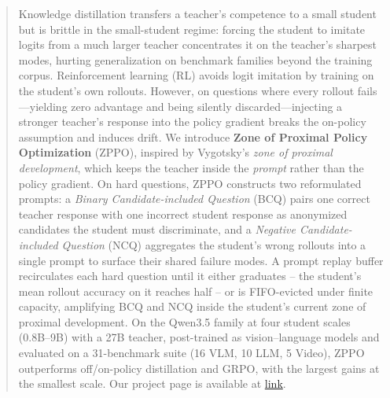\begin{abstract}
    Knowledge distillation transfers a teacher's competence to a small student but is brittle in the small-student regime: forcing the student to imitate logits from a much larger teacher concentrates it on the teacher's sharpest modes, hurting generalization on benchmark families beyond the training corpus. Reinforcement learning (RL) avoids logit imitation by training on the student's own rollouts. However, on questions where every rollout fails—yielding zero advantage and being silently discarded—injecting a stronger teacher's response into the policy gradient breaks the on-policy assumption and induces drift. We introduce \textbf{Zone of Proximal Policy Optimization} (ZPPO), inspired by Vygotsky's \emph{zone of proximal development}, which keeps the teacher inside the \emph{prompt} rather than the policy gradient. On hard questions, ZPPO constructs two reformulated prompts: a \emph{Binary Candidate-included Question} (BCQ) pairs one correct teacher response with one incorrect student response as anonymized candidates the student must discriminate, and a \emph{Negative Candidate-included Question} (NCQ) aggregates the student's wrong rollouts into a single prompt to surface their shared failure modes. A prompt replay buffer recirculates each hard question until it either graduates -- the student's mean rollout accuracy on it reaches half -- or is FIFO-evicted under finite capacity, amplifying BCQ and NCQ inside the student's current zone of proximal development. On the Qwen3.5 family at four student scales (0.8B--9B) with a 27B teacher, post-trained as vision--language models and evaluated on a 31-benchmark suite (16 VLM, 10 LLM, 5 Video), ZPPO outperforms off/on-policy distillation and GRPO, with the largest gains at the smallest scale. Our project page is available at \href{https://byungkwanlee.github.io/ZPPO-page/}{link}.
\end{abstract}
